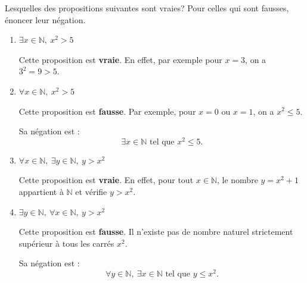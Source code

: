 

\begin{Exercice}[5 minutes]
    Lesquelles des propositions suivantes sont vraies? Pour celles qui sont fausses, énoncer leur négation.

\begin{solution}
\begin{enumerate}
    \item $\exists x \in \mathbb{N},\ x^2 > 5$

    Cette proposition est \textbf{vraie}.  
    En effet, par exemple pour $x = 3$, on a $3^2 = 9 > 5$.

    \item $\forall x \in \mathbb{N},\ x^2 > 5$

    Cette proposition est \textbf{fausse}.  
    Par exemple, pour $x = 0$ ou $x = 1$, on a $x^2 \le 5$.

    Sa négation est :
    \[
    \exists x \in \mathbb{N} \text{ tel que } x^2 \le 5.
    \]

    \item $\forall x \in \mathbb{N},\ \exists y \in \mathbb{N},\ y > x^2$

    Cette proposition est \textbf{vraie}.  
    En effet, pour tout $x \in \mathbb{N}$, le nombre $y = x^2 + 1$ appartient à $\mathbb{N}$ et vérifie $y > x^2$.

    \item $\exists y \in \mathbb{N},\ \forall x \in \mathbb{N},\ y > x^2$

    Cette proposition est \textbf{fausse}.  
    Il n’existe pas de nombre naturel strictement supérieur à tous les carrés $x^2$.

    Sa négation est :
    \[
    \forall y \in \mathbb{N},\ \exists x \in \mathbb{N} \text{ tel que } y \le x^2.
    \]
\end{enumerate}
\end{solution}
\end{Exercice}

